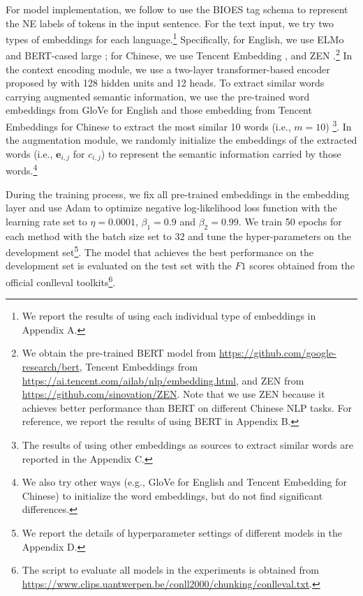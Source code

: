 \documentclass[11pt,a4paper]{article}
\begin{document}
For model implementation, we follow \citet{DBLP:conf/naacl/LampleBSKD16} to use the BIOES tag schema to represent the NE labels of tokens in the input sentence.
For the text input, we try two types of embeddings for each language.\footnote{We report the results of using each individual type of embeddings in Appendix A.}
Specifically, for English, we use 
ELMo \cite{DBLP:conf/naacl/PetersNIGCLZ18} and BERT-cased large  \cite{DBLP:conf/naacl/DevlinCLT19};
for Chinese, we use 
Tencent Embedding \cite{DBLP:conf/naacl/SongSLZ18}, and ZEN \cite{DBLP:journals/corr/zen}.\footnote{
We obtain the pre-trained BERT model from \url{https://github.com/google-research/bert},
Tencent Embeddings from \url{https://ai.tencent.com/ailab/nlp/embedding.html},
and ZEN from \url{https://github.com/sinovation/ZEN}.
Note that we use ZEN because it achieves better performance than BERT on different Chinese NLP tasks.
For reference, we report the results of using BERT in Appendix B.}
In the context encoding module, we use a two-layer transformer-based encoder proposed by \citet{DBLP:journals/corr/abs-1911-04474} with 128 hidden units and 12 heads.
To extract similar words carrying augmented semantic information, we use the pre-trained word embeddings from GloVe for English and those embedding from Tencent Embeddings for Chinese to extract the most similar 10 words (i.e., $m=10$) \footnote{The results of using other embeddings as sources to extract similar words are reported in the Appendix C.}.
In the augmentation module, we randomly initialize the embeddings of the extracted words (i.e., $\mathbf{e}_{i,j}$ for $c_{i,j}$) to represent the semantic information carried by those words.\footnote{We also try other ways (e.g., GloVe for English and Tencent Embedding for Chinese) to initialize the word embeddings, but do not find significant differences.}


During the training process, we fix all pre-trained embeddings in the embedding layer and use Adam \cite{DBLP:journals/corr/KingmaB14} to optimize negative log-likelihood loss function with the learning rate set to $\eta=0.0001$, $\beta_1=0.9$ and $\beta_2=0.99$. 
We train 50 epochs for each method with the batch size set to $32$ and tune the hyper-parameters on the development set\footnote{We report the details of hyperparameter settings of different models in the Appendix D.}.
The model that achieves the best performance on the development set is evaluated on the test set with the $F1$ scores obtained from the official conlleval toolkits\footnote{The script to evaluate all models in the experiments is obtained from \url{https://www.clips.uantwerpen.be/conll2000/chunking/conlleval.txt}.}.
\end{document}
